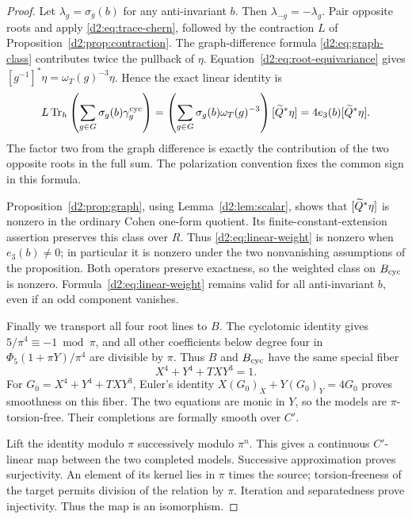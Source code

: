 \begin{proof}
Let \(\lambda_g=\sigma_g(b)\) for any anti-invariant \(b\).
Then \(\lambda_{-g}=-\lambda_g\).
Pair opposite roots and apply \eqref{d2:eq:trace-chern}, followed by
the contraction \(L\) of Proposition~\ref{d2:prop:contraction}.
The graph-difference formula \eqref{d2:eq:graph-class} contributes
twice the pullback of \(\eta\).
Equation~\eqref{d2:eq:root-equivariance} gives
\([g^{-1}]^*\eta=\omega_T(g)^{-3}\eta\).
Hence the exact linear identity is
\begin{equation}\label{d2:eq:linear-weight}
 L\operatorname{Tr}_h\left(\sum_{g\in G}\sigma_g(b)\gamma_g^{\mathrm{cyc}}\right)
   =
 \left(\sum_{g\in G}\sigma_g(b)\omega_T(g)^{-3}\right)
       [\widetilde Q^*\eta]
   =4e_3(b)[\widetilde Q^*\eta].
\end{equation}
The factor two from the graph difference is exactly the contribution
of the two opposite roots in the full sum.
The polarization convention fixes the common sign in this formula.

Proposition~\ref{d2:prop:graph}, using
Lemma~\ref{d2:lem:scalar}, shows that \([\widetilde Q^*\eta]\) is nonzero
in the ordinary Cohen one-form quotient.
Its finite-constant-extension assertion preserves this class over
\(R\).
Thus \eqref{d2:eq:linear-weight} is nonzero when \(e_3(b)\ne0\);
in particular it is nonzero under the two nonvanishing assumptions
of the proposition.
Both operators preserve exactness, so the weighted class on
\(B_{\mathrm{cyc}}\) is nonzero.
Formula~\eqref{d2:eq:linear-weight} remains valid for all anti-invariant \(b\), even if an odd component vanishes.

Finally we transport all four root lines to \(B\).
The cyclotomic identity gives \(5/\pi^4\equiv-1\bmod\pi\), and all
other coefficients below degree four in
\(\Phi_5(1+\pi Y)/\pi^4\) are divisible by \(\pi\).
Thus \(B\) and \(B_{\mathrm{cyc}}\) have the same special fiber
\[
 X^4+Y^4+TXY^3=1.
\]
For \(G_0=X^4+Y^4+TXY^3\), Euler's identity
\(X(G_0)_X+Y(G_0)_Y=4G_0\) proves smoothness on this fiber.
The two equations are monic in \(Y\), so the models are
\(\pi\)-torsion-free. Their completions are formally smooth over
\(C'\).

Lift the identity modulo \(\pi\) successively modulo \(\pi^n\).
This gives a continuous \(C'\)-linear map between the two completed
models.
Successive approximation proves surjectivity.
An element of its kernel lies in \(\pi\) times the source;
torsion-freeness of the target permits division of the relation by
\(\pi\). Iteration and separatedness prove injectivity.
Thus the map is an isomorphism.


\end{proof}
